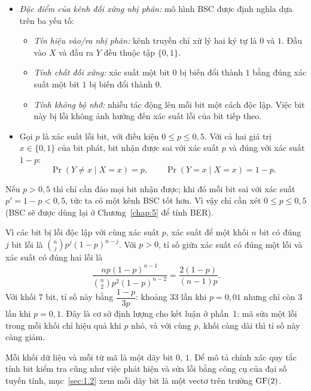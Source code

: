 \begin{itemize}
  \item \emph{Đặc điểm của kênh đối xứng nhị phân:} mô hình BSC được định
        nghĩa dựa trên ba yếu tố:
        \begin{itemize}
          \item \emph{Tín hiệu vào/ra nhị phân:} kênh truyền chỉ xử lý hai ký
                tự là $0$ và $1$. Đầu vào $X$ và đầu ra $Y$ đều thuộc tập
                $\{0,1\}$.
          \item \emph{Tính chất đối xứng:} xác suất một bit $0$ bị biến đổi
                thành $1$ bằng đúng xác suất một bit $1$ bị biến đổi thành
                $0$.
          \item \emph{Tính không bộ nhớ:} nhiễu tác động lên mỗi bit một cách
                độc lập. Việc bit này bị lỗi không ảnh hưởng đến xác suất lỗi
                của bit tiếp theo.
        \end{itemize}
  \item Gọi $p$ là xác suất lỗi bit, với điều kiện $0 \le p \le 0{,}5$. Với
        cả hai giá trị $x \in \{0, 1\}$ của bit phát, bit nhận được sai với
        xác suất $p$ và đúng với xác suất $1 - p$:
        \[
          \Pr(Y \neq x \mid X = x) = p, \qquad
          \Pr(Y = x \mid X = x) = 1 - p .
        \]
\end{itemize}

\begin{luuy}
Nếu $p > 0{,}5$ thì chỉ cần đảo mọi bit nhận được; khi
đó mỗi bit sai với xác suất $p' = 1 - p < 0{,}5$, tức ta có một kênh BSC tốt
hơn. Vì vậy chỉ cần xét $0 \le p \le 0{,}5$ (BSC sẽ được dùng lại ở
Chương~\ref{chap:5} để tính BER).
\end{luuy}

Vì các bit bị lỗi độc lập với cùng xác suất $p$, xác suất để một khối $n$ bit
có đúng $j$ bit lỗi là $\binom{n}{j} p^j (1-p)^{n-j}$. Với $p > 0$, tỉ số giữa
xác suất có đúng một lỗi và xác suất có đúng hai lỗi là
\[
  \frac{n p (1-p)^{n-1}}{\binom{n}{2} p^2 (1-p)^{n-2}}
  = \frac{2(1-p)}{(n-1)p} .
\]
Với khối $7$ bit, tỉ số này bằng $\dfrac{1-p}{3p}$: khoảng $33$ lần khi
$p = 0{,}01$ nhưng chỉ còn $3$ lần khi $p = 0{,}1$. Đây là cơ sở định lượng cho
kết luận ở phần~1: mã sửa một lỗi trong mỗi khối chỉ hiệu quả khi $p$ nhỏ, và
với cùng $p$, khối càng dài thì tỉ số này càng giảm.

Mỗi khối dữ liệu và mỗi từ mã là một dãy bit $0$, $1$. Để mô tả chính xác quy
tắc tính bit kiểm tra cũng như việc phát hiện và sửa lỗi bằng công cụ của đại
số tuyến tính, mục~\ref{sec:1.2} xem mỗi dãy bit là một vectơ trên trường
$\mathrm{GF}(2)$.

